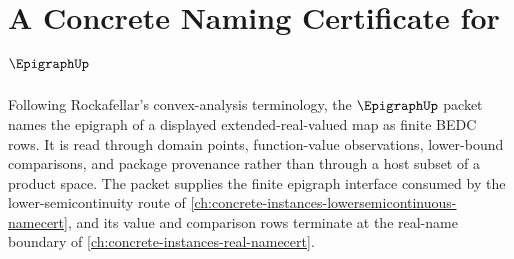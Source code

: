 \chapter{A Concrete Naming Certificate for $\EpigraphUp$}
\label{ch:concrete-instances-epigraph-namecert}

Following Rockafellar's convex-analysis terminology, the $\EpigraphUp$ packet names the epigraph of a displayed extended-real-valued map as finite BEDC rows. It is read through domain points, function-value observations, lower-bound comparisons, and package provenance rather than through a host subset of a product space. The packet supplies the finite epigraph interface consumed by the lower-semicontinuity route of \autoref{ch:concrete-instances-lowersemicontinuous-namecert}, and its value and comparison rows terminate at the real-name boundary of \autoref{ch:concrete-instances-real-namecert}.

